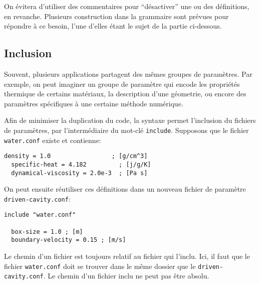 On \'evitera d'utiliser des commentaires pour ``d\'esactiver'' une ou
des d\'efinitions, en revanche. Plusieurs construction dans la
grammaire sont pr\'evues pour r\'epondre \`a ce besoin, l'une d'elles
\'etant le sujet de la partie ci-dessous.


\subsection{Inclusion}
Souvent, plusieurs applications partagent des m\^emes groupes de
param\`etres. Par exemple, on peut imaginer un groupe de param\`etre
qui encode les propri\'et\'es thermique de certains mat\'eriaux, la
description d'une g\'eometrie, ou encore des param\`etres
sp\'ecifiques \`a une certaine m\'ethode num\'erique.

Afin de minimiser la duplication du code, la syntaxe permet
l'inclusion du fichiers de param\`etres, par l'interm\'ediaire du
mot-cl\'e \texttt{include}. Supposons que le fichier \texttt{water.conf}
existe et contienne:
\begin{lstlisting}[language={},frame=single,basicstyle=\ttfamily]
  density = 1.0                 ; [g/cm^3]
  specific-heat = 4.182         ; [j/g/K]
  dynamical-viscosity = 2.0e-3  ; [Pa s]
\end{lstlisting}
On peut ensuite r\'eutiliser ces d\'efinitions dans un nouveau fichier
de param\`etre \texttt{driven-cavity.conf}:
\begin{lstlisting}[language={},frame=single,basicstyle=\ttfamily]
  include "water.conf"

  box-size = 1.0 ; [m]
  boundary-velocity = 0.15 ; [m/s]
\end{lstlisting}
Le chemin d'un fichier est toujours relatif au fichier qui
l'inclu. Ici, il faut que le fichier \texttt{water.conf} doit se
trouver dans le m\^eme dossier que le \texttt{driven-cavity.conf}. Le
chemin d'un fichier inclu ne peut pas \^etre absolu.


